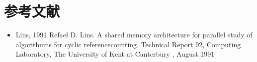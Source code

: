 \chapter{参考文献}
\label{chap:bib}


\begin{itemize}
\item \reviewbold{[]} Lins, 1991 Refael D. Lins. A shared memory architecture for parallel study of algorithums for cyclic reference\textunderscore{}counting. Technical Report 92, Computing Laboratory, The University of Kent at Canterbury , August 1991
\end{itemize}
